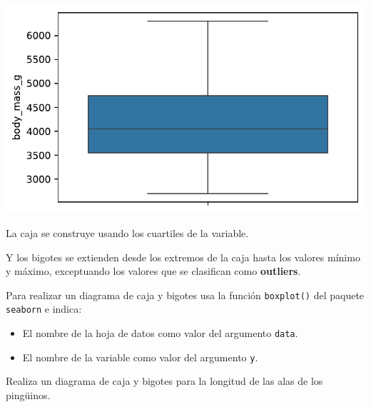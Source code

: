 \documentclass[
  a4paper,
  noprof,
  12pt,
  notoc,
  nosols,
  nobib]{mnye}
\providecommand{\tightlist}{%
  \setlength{\itemsep}{0pt}\setlength{\parskip}{0pt}}\usepackage{longtable,booktabs,array}
\renewenvironment{exercise}[1][]{
            \if\relax\detokenize{#1}\relax
                \ex
            \else
                \ex[note={#1}]
            \fi
        }{\endex}
\theoremstyle{definition}
\newtheorem{exercise}{Ejercicio}[section]
\theoremstyle{remark}
\begin{document}
\includegraphics{chapters/1numerical_files/figure-pdf/cell-6-output-1.pdf}

La caja se construye usando los cuartiles de la variable.

Y los bigotes se extienden desde los extremos de la caja hasta los
valores mínimo y máximo, exceptuando los valores que se clasifican como
\textbf{outliers}.

\begin{tcolorbox}[enhanced jigsaw, bottomrule=.15mm, colframe=quarto-callout-note-color-frame, toprule=.15mm, leftrule=.75mm, breakable, left=2mm, arc=.35mm, rightrule=.15mm, colback=white, opacityback=0]
\begin{minipage}[t]{5.5mm}
\textcolor{quarto-callout-note-color}{\faInfo}
\end{minipage}%
\begin{minipage}[t]{\textwidth - 5.5mm}

Para realizar un diagrama de caja y bigotes usa la función
\texttt{boxplot()} del paquete \texttt{seaborn} e indica:

\begin{itemize}
\tightlist
\item
  El nombre de la hoja de datos como valor del argumento \texttt{data}.
\item
  El nombre de la variable como valor del argumento \texttt{y}.
\end{itemize}

\end{minipage}%
\end{tcolorbox}

\begin{exercise}[]%
\protect\hypertarget{exr-1numerical-boxplot}{}\label{exr-1numerical-boxplot}%
Realiza un diagrama de caja y bigotes para la longitud de las alas de
los pingüinos.

\end{exercise}
\end{document}
